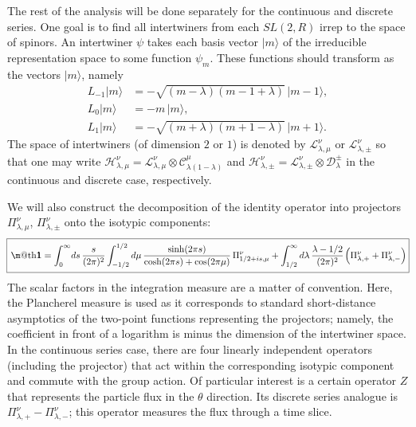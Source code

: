 \documentclass[12pt]{article}
\makeatletter
\newcommand*{\wideboxed}[1]{\setlength{\fboxsep}{1ex}%
  \fbox{\m@th$\displaystyle#1$}}
\newcommand*{\ket}[1]{|{#1}\rangle}
\newcommand{\calC}{\mathcal{C}}
\newcommand{\calD}{\mathcal{D}}
\newcommand{\calH}{\mathcal{H}}
\newcommand{\calL}{\mathcal{L}}
\newcommand{\RR}{\mathbb{R}}
\newcommand{\CC}{\mathbb{C}}
\DeclareMathOperator{\SL}{SL}
\newcommand{\unit}{\mathbf{1}}
\newcommand{\lam}{\lambda}
\newcommand{\ov}{\over}
\def\widetilde#1{#1}%
\def\SL{SL}
\def\RR{R}
\makeatother
\begin{document}
The rest of the analysis will be done separately for the continuous and discrete series. One goal is to find all intertwiners from each $\widetilde{\SL}(2,\RR)$ irrep to the space of spinors. An intertwiner $\psi$ takes each basis vector $\ket{m}$ of the irreducible representation space to some function $\psi_m$. These functions should transform as the vectors $\ket{m}$, namely
\begin{equation}\label{bvtrans}
\begin{aligned}
L_{-1}\ket{m}&=-\sqrt{(m-\lambda)(m-1+\lambda)}\,\ket{m-1},\\[3pt]
L_0\ket{m}&=-m\,\ket{m},\\[3pt]
L_1\ket{m}&=-\sqrt{(m+\lambda)(m+1-\lambda)}\,\ket{m+1}.
\end{aligned}
\end{equation}
The space of intertwiners (of dimension $2$ or $1$) is denoted by $\calL^{\nu}_{\lambda,\mu}$ or $\calL^{\nu}_{\lambda,\pm}$ so that one may write $\calH^{\nu}_{\lambda,\mu}= \calL^{\nu}_{\lambda,\mu}\otimes\calC_{\lambda(1-\lambda)}^{\mu}$ and $\calH^{\nu}_{\lambda,\pm}= \calL^{\nu}_{\lambda,\pm}\otimes\calD_{\lambda}^{\pm}$ in the continuous and discrete case, respectively.

We will also construct the decomposition of the identity operator into projectors $\Pi^{\nu}_{\lambda,\mu}$, $\Pi^{\nu}_{\lambda,\pm}$ onto the isotypic components:
\begin{equation}
\!\wideboxed{
\unit=\int_{0}^{\infty}\!ds\,{s \ov (2\pi)^2}
\int_{-1/2}^{1/2}d\mu\, \frac{\sinh(2\pi s)}{\cosh(2\pi s)+\cos(2\pi\mu)}\,
\Pi^{\nu}_{1/2+is,\mu}
+\int_{1/2}^{\infty}d\lam\,\frac{\lambda-1/2}{(2\pi)^2}\kern1pt
\Bigl(\Pi_{\lambda,+}^{\nu}+\Pi_{\lambda,-}^{\nu}\Bigr)\!
}\!
\end{equation}
The scalar factors in the integration measure are a matter of convention. Here, the Plancherel measure is used as it corresponds to standard short-distance asymptotics of the two-point functions representing the projectors; namely, the coefficient in front of a logarithm is minus the dimension of the intertwiner space. In the continuous series case, there are four linearly independent operators (including the projector) that act within the corresponding isotypic component and commute with the group action. Of particular interest is a certain operator $Z$ that represents the particle flux in the $\theta$ direction. Its discrete series analogue is $\Pi_{\lambda,+}^{\nu}-\Pi_{\lambda,-}^{\nu}$; this operator measures the flux through a time slice.
\end{document}
